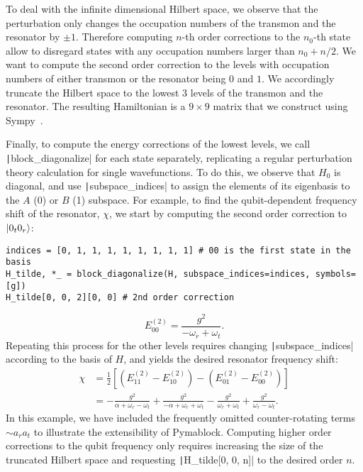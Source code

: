 To deal with the infinite dimensional Hilbert space, we observe that the perturbation only changes the occupation numbers of the transmon and the resonator by $\pm 1$.
Therefore computing $n$-th order corrections to the $n_0$-th state allow to disregard states with any occupation numbers larger than $n_0 + n/2$.
We want to compute the second order correction to the levels with occupation numbers of either transmon or the resonator being $0$ and $1$.
We accordingly truncate the Hilbert space to the lowest 3 levels of the transmon and the resonator.
The resulting Hamiltonian is a $9 \times 9$ matrix that we construct using Sympy~\cite{Meurer_2017}.

Finally, to compute the energy corrections of the lowest levels, we call \texttt|block_diagonalize| for each state separately, replicating a regular perturbation theory calculation for single wavefunctions.
To do this, we observe that $H_0$ is diagonal, and use \texttt|subspace_indices| to assign the elements of its eigenbasis to the $A$ (0) or $B$ (1) subspace.
For example, to find the qubit-dependent frequency shift of the resonator, $\chi$, we start by computing the second order correction to $\ket{0_{t}0_{r}}$:
%
\begin{verbatim}
indices = [0, 1, 1, 1, 1, 1, 1, 1, 1] # 00 is the first state in the basis
H_tilde, *_ = block_diagonalize(H, subspace_indices=indices, symbols=[g])
H_tilde[0, 0, 2][0, 0] # 2nd order correction
\end{verbatim}
%
\begin{equation}
    E^{(2)}_{00} = \frac{g^{2}}{-\omega_{r} + \omega_{t}}.
\end{equation}
%
Repeating this process for the other levels requires changing \texttt|subspace_indices| according to the basis of $H$, and yields the desired resonator frequency shift:
%
\begin{equation}
\begin{aligned}
\chi &= \frac{1}{2}\left[(E^{(2)}_{11} - E^{(2)}_{10}) - (E^{(2)}_{01} - E^{(2)}_{00})\right] \\
& = - \frac{g^{2}}{\alpha + \omega_{r} - \omega_{t}} + \frac{g^{2}}{- \alpha + \omega_{r} + \omega_{t}} - \frac{g^{2}}{\omega_{r} + \omega_{t}} + \frac{g^{2}}{\omega_{r} - \omega_{t}}.
\end{aligned}
\end{equation}
%
In this example, we have included the frequently omitted counter-rotating terms $\sim a_{r} a_{t}$ to illustrate the extensibility of Pymablock.
Computing higher order corrections to the qubit frequency only requires increasing the size of the truncated Hilbert space and requesting \texttt|H_tilde[0, 0, n]| to the desired order $n$.

